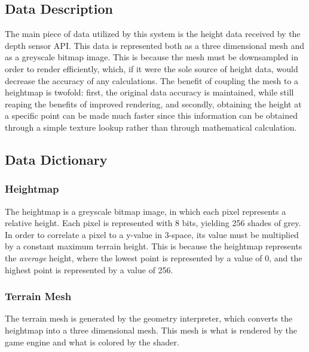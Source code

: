 \documentclass[onecolumn, draftclsnofoot,10pt, compsoc]{IEEEtran}
\begin{document}
\subsection{Data Description}
The main piece of data utilized by this system is the height data received by the depth sensor API. This data is represented both as a three dimensional mesh and as a greyscale bitmap image. 
This is because the mesh must be downsampled in order to render efficiently, which, if it were the sole source of height data, would decrease the accuracy of any calculations. 
The benefit of coupling the mesh to a heightmap is twofold: first, the original data accuracy is maintained, while still reaping the benefits of improved rendering, and secondly, obtaining the height at a specific point can be made much faster since this information can be obtained through a simple texture lookup rather than through mathematical calculation.  

\subsection{Data Dictionary}
\subsubsection{Heightmap}
The heightmap is a greyscale bitmap image, in which each pixel represents a relative height. 
Each pixel is represented with 8 bits, yielding 256 shades of grey. 
In order to correlate a pixel to a y-value in 3-space, its value must be multiplied by a constant maximum terrain height. 
This is because the heightmap represents the \textit{average} height, where the lowest point is represented by a value of 0, and the highest point is represented by a value of 256.
\subsubsection{Terrain Mesh}
The terrain mesh is generated by the geometry interpreter, which converts the heightmap into a three dimensional mesh. This mesh is what is rendered by the game engine and what is colored by the shader.

\end{document}
